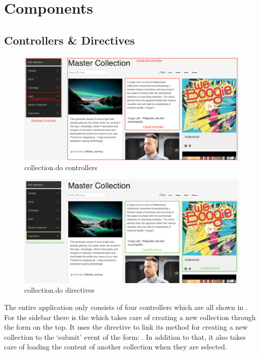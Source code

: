 \section{Components}

\subsection{Controllers \& Directives}

\begin{figure}[htb]
  \centerline{
    \includegraphics[width=\linewidth]{images/collection-controllers.png}
  }
  \caption[collection.do controllers]{collection.do controllers}
  \label{fig:collection-controllers}
\end{figure}

\begin{figure}[htb]
  \centerline{
    \includegraphics[width=\linewidth]{images/collection-directives.png}
  }
  \caption[collection.do directives]{collection.do directives}
  \label{fig:collection-directives}
\end{figure}

The entire application only consists of four controllers which are all shown in . For the sidebar there is the  which takes care of creating a new collection through the form on the top. It uses the  directive to link its method for creating a new collection to the `submit' event of the form: . In addition to that, it also takes care of loading the content of another collection when they are selected.

